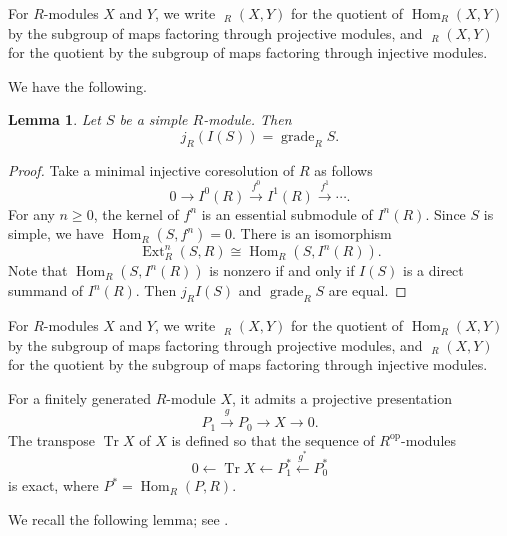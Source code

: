 \documentclass[a4paper,reqno]{amsart}
\numberwithin{equation}{section}
\theoremstyle{plain}
\newtheorem{lem}[thm]{Lemma}
\theoremstyle{definition}
\theoremstyle{remark}
\DeclareMathOperator{\Hom}{Hom}
\DeclareMathOperator{\Ext}{Ext}
\DeclareMathOperator{\uHom}{\underline{Hom}}
\DeclareMathOperator{\oHom}{\overline{Hom}}
\DeclareMathOperator{\grade}{grade}
\DeclareMathOperator{\op}{op}
\DeclareMathOperator{\Tr}{Tr}
\newcommand{\from}{\leftarrow}
\newcommand{\lto}{\longrightarrow}
\newcommand{\lfrom}{\longleftarrow}
\renewcommand{\-}{\mbox{-}}
\begin{document}
For $R$-modules $X$ and $Y$, we write
$\uHom_R(X,Y)$ for the quotient of $\Hom_R(X,Y)$ by the subgroup of maps
factoring through projective modules, and $\oHom_R(X,Y)$ for the quotient by
the subgroup of maps factoring through injective modules.

We have the following.

\begin{lem} \label{lem:j-grade}
Let \(S\) be a simple \(R\)-module. Then
\begin{equation*}
    j_R(I(S))=\grade_RS.
\end{equation*}
\end{lem}



\begin{proof}
    Take a minimal injective coresolution of \(R\) as follows
    \begin{equation*}
        0 \to I^0(R)\overset{f^0}\lto I^1(R)\overset{f^1}\lto \cdots.
    \end{equation*}
    For any \(n\ge 0\), the kernel of \(f^n\) is an essential submodule of \(I^n(R)\).
    Since \(S\) is simple, we have \(\Hom_R(S,f^n)=0\).
    There is an isomorphism
    \begin{equation*}
        \Ext^n_R(S,R)\cong \Hom_R(S,I^n(R)).
    \end{equation*}
    Note that \(\Hom_R(S,I^n(R))\) is nonzero if and only if \(I(S)\) is a direct summand of \(I^n(R)\).
    Then \(j_RI(S)\) and \(\grade_RS\) are equal.
\end{proof}



For $R$-modules $X$ and $Y$, we write
$\uHom_R(X,Y)$ for the quotient of $\Hom_R(X,Y)$ by the subgroup of maps
factoring through projective modules, and $\oHom_R(X,Y)$ for the quotient by
the subgroup of maps factoring through injective modules.


For a finitely generated \(R\)-module \(X\), 
it admits a projective presentation
\begin{equation*}
    P_1 \overset{g}\lto P_0 \to X \to 0.
\end{equation*}
The {transpose} \(\Tr X\) of \(X\)
is defined so that the sequence of \(R^{\op}\)-modules
\begin{equation*}
    0\from \Tr X \from P^*_1 \overset{g^*}\lfrom P^*_0
\end{equation*}
is exact, where \(P^* = \Hom_R(P,R)\).




We recall the following lemma; see  \cite[2.8]{AB69}.
\end{document}
